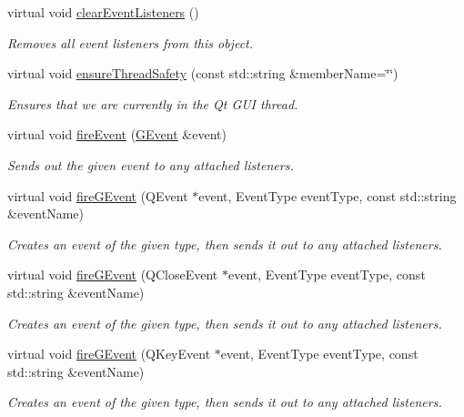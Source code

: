 \begin{DoxyCompactItemize}
\item 
virtual void \mbox{\hyperlink{classGObservable_a80cfa040459ff53594adbd6a51ec8f43}{clear\+Event\+Listeners}} ()
\begin{DoxyCompactList}\small\item\em Removes all event listeners from this object. \end{DoxyCompactList}\item 
virtual void \mbox{\hyperlink{classGObservable_a284f31528c0520f8e545c03ac9eeac74}{ensure\+Thread\+Safety}} (const std\+::string \&member\+Name=\char`\"{}\char`\"{})
\begin{DoxyCompactList}\small\item\em Ensures that we are currently in the Qt G\+UI thread. \end{DoxyCompactList}\item 
virtual void \mbox{\hyperlink{classGObservable_a63e5e5a6227c59c928493b11aceb0f67}{fire\+Event}} (\mbox{\hyperlink{classGEvent}{G\+Event}} \&event)
\begin{DoxyCompactList}\small\item\em Sends out the given event to any attached listeners. \end{DoxyCompactList}\item 
virtual void \mbox{\hyperlink{classGObservable_ab3983ea07337b52020a29cc00c653d8d}{fire\+G\+Event}} (Q\+Event $\ast$event, Event\+Type event\+Type, const std\+::string \&event\+Name)
\begin{DoxyCompactList}\small\item\em Creates an event of the given type, then sends it out to any attached listeners. \end{DoxyCompactList}\item 
virtual void \mbox{\hyperlink{classGObservable_a01fdf1b0e0dbd49e189fe4514e010411}{fire\+G\+Event}} (Q\+Close\+Event $\ast$event, Event\+Type event\+Type, const std\+::string \&event\+Name)
\begin{DoxyCompactList}\small\item\em Creates an event of the given type, then sends it out to any attached listeners. \end{DoxyCompactList}\item 
virtual void \mbox{\hyperlink{classGObservable_abb0b2f66ba39211cb5d7615e9d1c04e2}{fire\+G\+Event}} (Q\+Key\+Event $\ast$event, Event\+Type event\+Type, const std\+::string \&event\+Name)
\begin{DoxyCompactList}\small\item\em Creates an event of the given type, then sends it out to any attached listeners. \end{DoxyCompactList}\item 

\end{DoxyCompactItemize}
